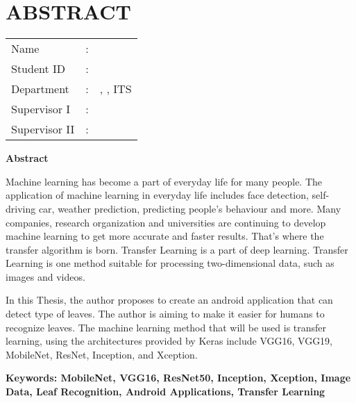 \chapter {ABSTRACT}
\noindent\textbf{\MakeUppercase\juduleng}
\vspace*{1em}

\begin{tabularx}{\linewidth}{ l l X }
	Name 			& : & \penulis \\
	Student ID		& :	& \nrp \\
	Department 		& : & \jurusaneng, \newline \fakultaseng, ITS \\
	Supervisor I 	& : & \pembimbingsatu \\
	Supervisor II 	& : & \pembimbingdua
	\vspace*{1em} 	%
\end {tabularx}
	
\noindent\textbf{Abstract} \\
\itshape
\par Machine learning has become a part of everyday life for many people. The application of machine learning in everyday life includes face detection, self-driving car, weather prediction, predicting people's behaviour and more. Many companies, research organization and universities are continuing to develop machine learning to get more accurate and faster results. That's where the transfer algorithm is born. Transfer Learning is a part of deep learning. Transfer Learning is one method suitable for processing two-dimensional data, such as images and videos.
\par In this Thesis, the author proposes to create an android application that can detect type of leaves. The author is aiming to make it easier for humans to recognize leaves. The machine learning method that will be used is transfer learning, using the architectures provided by Keras include VGG16, VGG19, MobileNet, ResNet, Inception, and Xception.

\vspace*{1em}
\noindent\bfseries Keywords: MobileNet, VGG16, ResNet50, Inception, Xception, Image Data, Leaf Recognition, Android Applications, Transfer Learning
\normalfont
\cleardoublepage